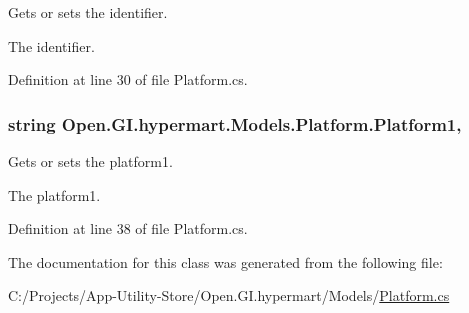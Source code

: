 Gets or sets the identifier. 

The identifier. 

Definition at line 30 of file Platform.\+cs.

\hypertarget{class_open_1_1_g_i_1_1hypermart_1_1_models_1_1_platform_aa93619cbb18655b2425f416df0f194c6}{}
\subsubsection[{Platform1}]{\setlength{\rightskip}{0pt plus 5cm}string Open.\+G\+I.\+hypermart.\+Models.\+Platform.\+Platform1\hspace{0.3cm}{\ttfamily [get]}, {\ttfamily [set]}}\label{class_open_1_1_g_i_1_1hypermart_1_1_models_1_1_platform_aa93619cbb18655b2425f416df0f194c6}


Gets or sets the platform1. 

The platform1. 

Definition at line 38 of file Platform.\+cs.



The documentation for this class was generated from the following file\+:\begin{DoxyCompactItemize}
\item 
C\+:/\+Projects/\+App-\/\+Utility-\/\+Store/\+Open.\+G\+I.\+hypermart/\+Models/\hyperlink{_models_2_platform_8cs}{Platform.\+cs}\end{DoxyCompactItemize}
